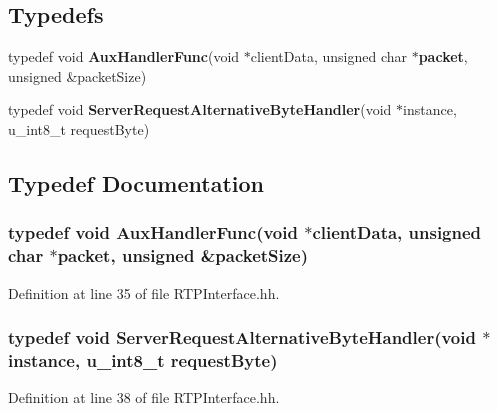 \subsection*{Typedefs}
\begin{DoxyCompactItemize}
\item 
typedef void {\bf Aux\+Handler\+Func}(void $\ast$client\+Data, unsigned char $\ast${\bf packet}, unsigned \&packet\+Size)
\item 
typedef void {\bf Server\+Request\+Alternative\+Byte\+Handler}(void $\ast$instance, u\+\_\+int8\+\_\+t request\+Byte)
\end{DoxyCompactItemize}


\subsection{Typedef Documentation}
\subsubsection[{Aux\+Handler\+Func}]{\setlength{\rightskip}{0pt plus 5cm}typedef void Aux\+Handler\+Func(void $\ast$client\+Data, unsigned char $\ast${\bf packet}, unsigned \&packet\+Size)}\label{RTPInterface_8hh_a411d48aff675039fca6b91e3c9c170b7}


Definition at line 35 of file R\+T\+P\+Interface.\+hh.

\subsubsection[{Server\+Request\+Alternative\+Byte\+Handler}]{\setlength{\rightskip}{0pt plus 5cm}typedef void Server\+Request\+Alternative\+Byte\+Handler(void $\ast$instance, u\+\_\+int8\+\_\+t request\+Byte)}\label{RTPInterface_8hh_a5a84d5ef4fd98b538f206e7c6419eefe}


Definition at line 38 of file R\+T\+P\+Interface.\+hh.

